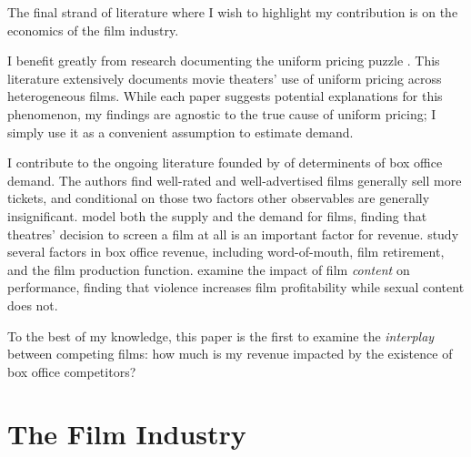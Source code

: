 \documentclass{article}
\begin{document}
The final strand of literature where I wish to highlight my contribution is on the economics of the film industry. 

I benefit greatly from research documenting the uniform pricing puzzle \parencite{orbach2007IRLE, gil2009MS, ho2018MR}. This literature extensively documents movie theaters' use of uniform pricing across heterogeneous films. While each paper suggests potential explanations for this phenomenon, my findings are agnostic to the true cause of uniform pricing; I simply use it as a convenient assumption to estimate demand.

I contribute to the ongoing literature founded by \textcite{prag1994CE} of determinents of box office demand. The authors find well-rated and well-advertised films generally sell more tickets, and conditional on those two factors other observables are generally insignificant. \textcite{elberse2003MS} model both the supply and the demand for films, finding that theatres' decision to screen a film at all is an important factor for revenue. \textcite{devany1996E, devany1997EI, devany1999JCE, devany2004EDC} study several factors in box office revenue, including word-of-mouth, film retirement, and the film production function. \textcite{ravid2004B} examine the impact of film \emph{content} on performance, finding that violence increases film profitability while sexual content does not. 

To the best of my knowledge, this paper is the first to examine the \emph{interplay} between competing films: how much is my revenue impacted by the existence of box office competitors?


\section{The Film Industry}
\end{document}

